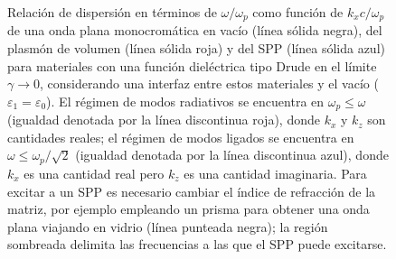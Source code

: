 \begin{figure}[h!]\centering
\vspace*{-1em}
	\caption{Relación de dispersión en términos de $\omega/\omega_p$ como función de $k_xc/\omega_p$ de una onda plana monocromática en vacío (línea sólida negra), del plasmón de volumen (línea sólida roja) y del SPP (línea sólida azul) para materiales con una función dieléctrica tipo Drude en el límite $\gamma\to 0$, considerando una interfaz entre estos materiales y el vacío ($\varepsilon_1 =\varepsilon_0$). El régimen de modos radiativos se encuentra en $\omega_p\leq\omega$ (igualdad denotada por la línea discontinua roja), donde $k_x$ y $k_z$ son cantidades reales; el régimen de modos ligados se encuentra en $\omega\leq\omega_p/\sqrt{2}$ (igualdad denotada por la línea discontinua azul), donde $k_x$ es una cantidad real pero $k_z$ es una cantidad imaginaria. Para excitar a un SPP es necesario cambiar el índice de refracción de la matriz, por ejemplo empleando un prisma para obtener una onda plana viajando en vidrio (línea punteada negra); la región sombreada delimita las frecuencias a las que el SPP puede excitarse.}
	\label{fig:Relaciones_de_dispersion}
	\end{figure}		

